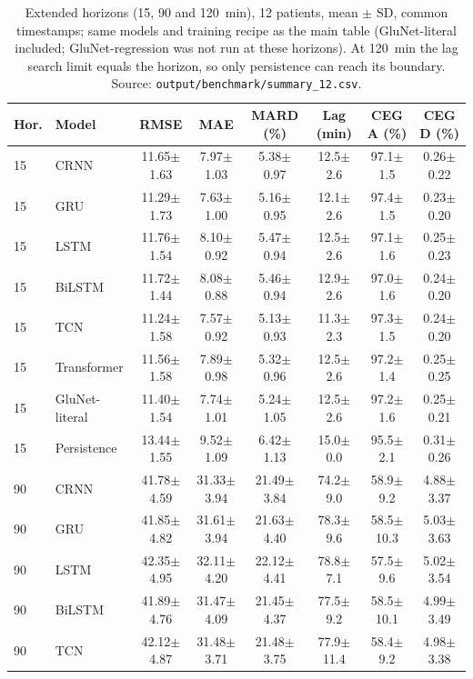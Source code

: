 \documentclass[conference]{IEEEtran}
\begin{document}
\begin{table}[t]\centering\caption{Extended horizons (15, 90 and 120~min), 12 patients, mean $\pm$ SD, common timestamps; same models and training recipe as the main table (GluNet-literal included; GluNet-regression was not run at these horizons). At 120~min the lag search limit equals the horizon, so only persistence can reach its boundary. Source: \texttt{output/benchmark/summary\_12.csv}.}
\small\begin{tabular}{llcccccc}\toprule
Hor. & Model & RMSE & MAE & MARD (\%) & Lag (min) & CEG A (\%) & CEG D (\%)\\\midrule
15 & CRNN & 11.65$\pm$1.63 & 7.97$\pm$1.03 & 5.38$\pm$0.97 & 12.5$\pm$2.6 & 97.1$\pm$1.5 & 0.26$\pm$0.22\\
15 & GRU & 11.29$\pm$1.73 & 7.63$\pm$1.00 & 5.16$\pm$0.95 & 12.1$\pm$2.6 & 97.4$\pm$1.5 & 0.23$\pm$0.20\\
15 & LSTM & 11.76$\pm$1.54 & 8.10$\pm$0.92 & 5.47$\pm$0.94 & 12.5$\pm$2.6 & 97.1$\pm$1.6 & 0.25$\pm$0.23\\
15 & BiLSTM & 11.72$\pm$1.44 & 8.08$\pm$0.88 & 5.46$\pm$0.94 & 12.9$\pm$2.6 & 97.0$\pm$1.6 & 0.24$\pm$0.20\\
15 & TCN & 11.24$\pm$1.58 & 7.57$\pm$0.92 & 5.13$\pm$0.93 & 11.3$\pm$2.3 & 97.3$\pm$1.5 & 0.24$\pm$0.20\\
15 & Transformer & 11.56$\pm$1.58 & 7.89$\pm$0.98 & 5.32$\pm$0.96 & 12.5$\pm$2.6 & 97.2$\pm$1.4 & 0.25$\pm$0.25\\
15 & GluNet-literal & 11.40$\pm$1.54 & 7.74$\pm$1.01 & 5.24$\pm$1.05 & 12.5$\pm$2.6 & 97.2$\pm$1.6 & 0.25$\pm$0.21\\
15 & Persistence & 13.44$\pm$1.55 & 9.52$\pm$1.09 & 6.42$\pm$1.13 & 15.0$\pm$0.0 & 95.5$\pm$2.1 & 0.31$\pm$0.26\\
\midrule
90 & CRNN & 41.78$\pm$4.59 & 31.33$\pm$3.94 & 21.49$\pm$3.84 & 74.2$\pm$9.0 & 58.9$\pm$9.2 & 4.88$\pm$3.37\\
90 & GRU & 41.85$\pm$4.82 & 31.61$\pm$3.94 & 21.63$\pm$4.40 & 78.3$\pm$9.6 & 58.5$\pm$10.3 & 5.03$\pm$3.63\\
90 & LSTM & 42.35$\pm$4.95 & 32.11$\pm$4.20 & 22.12$\pm$4.41 & 78.8$\pm$7.1 & 57.5$\pm$9.6 & 5.02$\pm$3.54\\
90 & BiLSTM & 41.89$\pm$4.76 & 31.47$\pm$4.09 & 21.45$\pm$4.37 & 77.5$\pm$9.2 & 58.5$\pm$10.1 & 4.99$\pm$3.49\\
90 & TCN & 42.12$\pm$4.87 & 31.48$\pm$3.71 & 21.48$\pm$3.75 & 77.9$\pm$11.4 & 58.4$\pm$9.2 & 4.98$\pm$3.38\\

\end{tabular}
\end{table}
\end{document}
